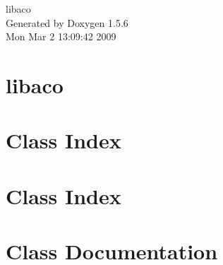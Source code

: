 \documentclass[a4paper]{book}
\begin{document}
\begin{titlepage}
\vspace*{7cm}
\begin{center}
{\Large libaco }\\
\vspace*{1cm}
{\large Generated by Doxygen 1.5.6}\\
\vspace*{0.5cm}
{\small Mon Mar 2 13:09:42 2009}\\
\end{center}
\end{titlepage}
\clearemptydoublepage
{}
\tableofcontents
\clearemptydoublepage
{}
\chapter{libaco}
\label{index}\hypertarget{index}{}
\chapter{Class Index}

\chapter{Class Index}

\chapter{Class Documentation}












\printindex
\end{document}

